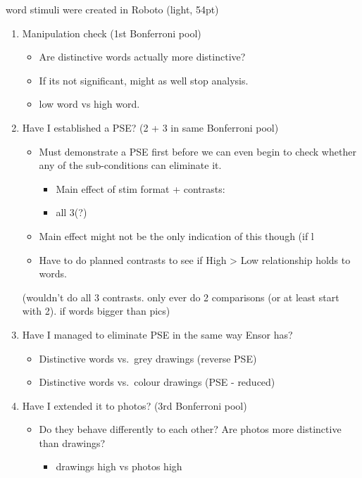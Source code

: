\documentclass[
  11pt,
]{article}
\providecommand{\tightlist}{%
  \setlength{\itemsep}{0pt}\setlength{\parskip}{0pt}}
\begin{document}
word stimuli were created in Roboto (light, 54pt)

\begin{enumerate}
\def\labelenumi{\arabic{enumi})}
\item
  Manipulation check (1st Bonferroni pool)

  \begin{itemize}
  \tightlist
  \item
    Are distinctive words actually more distinctive?
  \item
    If its not significant, might as well stop analysis.
  \item
    low word vs high word.
  \end{itemize}
\item
  Have I established a PSE? (2 + 3 in same Bonferroni pool)

  \begin{itemize}
  \tightlist
  \item
    Must demonstrate a PSE first before we can even begin to check
    whether any of the sub-conditions can eliminate it.

    \begin{itemize}
    \tightlist
    \item
      Main effect of stim format + contrasts:
    \item
      all 3(?)
    \end{itemize}
  \item
    Main effect might not be the only indication of this though (if l
  \item
    Have to do planned contrasts to see if High \textgreater{} Low
    relationship holds to words.
  \end{itemize}

  (wouldn't do all 3 contrasts. only ever do 2 comparisons (or at least
  start with 2). if words bigger than pics)
\item
  Have I managed to eliminate PSE in the same way Ensor has?

  \begin{itemize}
  \tightlist
  \item
    Distinctive words vs.~grey drawings (reverse PSE)
  \item
    Distinctive words vs.~colour drawings (PSE - reduced)
  \end{itemize}
\item
  Have I extended it to photos? (3rd Bonferroni pool)

  \begin{itemize}
  \tightlist
  \item
    Do they behave differently to each other? Are photos more
    distinctive than drawings?

    \begin{itemize}
    \tightlist
    \item
      drawings high vs photos high
    \end{itemize}
  \end{itemize}
\end{enumerate}
\end{document}
